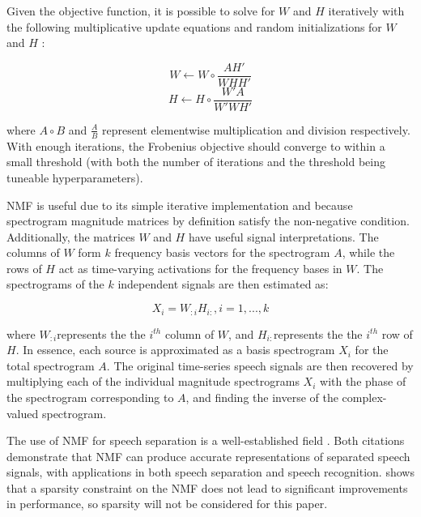 \documentclass[12pt,chapterheads]{ucsd}
\begin{document}
Given the objective function, it is possible to solve for $W$ and $H$ iteratively with the following multiplicative update equations and random initializations for $W$ and $H$ \cite{Lee00algorithmsfor}:

\begin{equation}
W \leftarrow W \circ \frac{AH'}{WHH'}
\end{equation}
\begin{equation}
H \leftarrow H \circ \frac{W'A}{W'WH'}
\end{equation}

\noindent where $A \circ B$ and $\frac{A}{B}$ represent elementwise multiplication and division respectively. With enough iterations, the Frobenius objective should converge to within a small threshold (with both the number of iterations and the threshold being tuneable hyperparameters).

NMF is useful due to its simple iterative implementation and because spectrogram magnitude matrices by definition satisfy the non-negative condition.  Additionally, the matrices $W$ and $H$ have useful signal interpretations. The columns of $W$ form $k$ frequency basis vectors for the spectrogram $A$, while the rows of $H$ act as time-varying activations for the frequency bases in $W$. The spectrograms of the $k$ independent signals are then estimated as:

\begin{equation}
X_i = W_{:i}H_{i:}, i=1,...,k
\end{equation}

\noindent where $W_{:i} $represents the the $i^{th}$ column of $W$, and $H_{i:} $represents the the $i^{th}$ row of $H$. In essence, each source is approximated as a basis spectrogram $X_i$ for the total spectrogram $A$. The original time-series speech signals are then recovered by multiplying each of the individual magnitude spectrograms $X_i$ with the phase of the spectrogram corresponding to $A$, and finding the inverse of the complex-valued spectrogram.

The use of NMF for speech separation is a well-established field \cite{Schmidt_Olsson_2006}\cite{Virtanen_2007}. Both citations demonstrate that NMF can produce accurate representations of separated speech signals, with applications in both speech separation and speech recognition. \cite{Virtanen_2007} shows that a sparsity constraint on the NMF does not lead to significant improvements in performance, so sparsity will not be considered for this paper.
\end{document}
